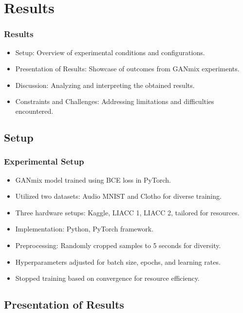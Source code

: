 \section{Results}

\begin{frame}
    \frametitle{Results}

    \begin{itemize}
        \item Setup: Overview of experimental conditions and configurations.
        \item Presentation of Results: Showcase of outcomes from GANmix experiments.
        \item Discussion: Analyzing and interpreting the obtained results.
        \item Constraints and Challenges: Addressing limitations and difficulties encountered.
    \end{itemize}
\end{frame}


\subsection{Setup}

\begin{frame}
    \frametitle{Experimental Setup}

    \begin{itemize}
        \item GANmix model trained using BCE loss in PyTorch.
        \item Utilized two datasets: Audio MNIST and Clotho for diverse training.
        \item Three hardware setups: Kaggle, LIACC 1, LIACC 2, tailored for resources.
        \item Implementation: Python, PyTorch framework.
        \item Preprocessing: Randomly cropped samples to 5 seconds for diversity.
        \item Hyperparameters adjusted for batch size, epochs, and learning rates.
        \item Stopped training based on convergence for resource efficiency.
    \end{itemize}
\end{frame}

\subsection{Presentation of Results}

